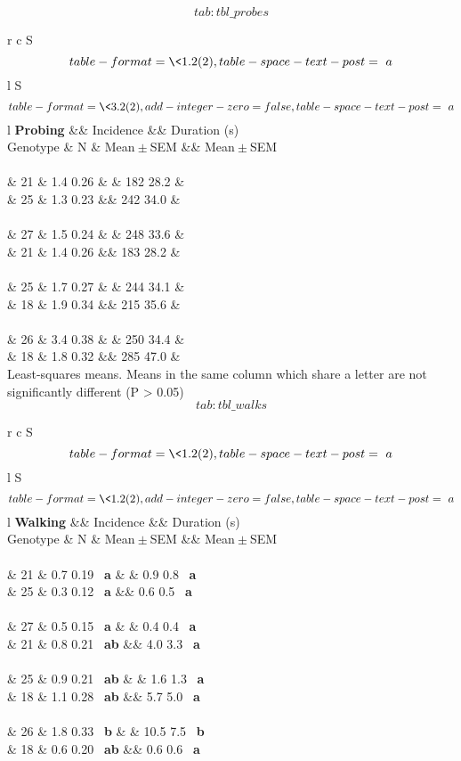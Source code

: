 \documentclass[]{article}
\begin{document}
\protect\hypertarget{tab:tbl_probes}{}{\[tab:tbl\_probes\]}

r c S\[table-format= \<1.2(2),table-space-text-post= a\] l
S\[table-format= \<3.2(2), add-integer-zero=false,
table-space-text-post= a\] l \textbf{Probing} \&\& Incidence \&\&
Duration (s)\\
Genotype \& N \& Mean\({}\pm{}\)SEM \&\& Mean\({}\pm{}\)SEM\\
~\\
\& 21 \& 1.4 0.26 \& \& 182 28.2 \&\\
\& 25 \& 1.3 0.23 \&\& 242 34.0 \&\\
~\\
\& 27 \& 1.5 0.24 \& \& 248 33.6 \&\\
\& 21 \& 1.4 0.26 \&\& 183 28.2 \&\\
~\\
\& 25 \& 1.7 0.27 \& \& 244 34.1 \&\\
\& 18 \& 1.9 0.34 \&\& 215 35.6 \&\\
~\\
\& 26 \& 3.4 0.38 \& \& 250 34.4 \&\\
\& 18 \& 1.8 0.32 \&\& 285 47.0 \&\\

Least-squares means. Means in the same column which share a letter are
not significantly different (P \textgreater{} 0.05)\\

\protect\hypertarget{tab:tbl_walks}{}{\[tab:tbl\_walks\]}

r c S\[table-format= \<1.2(2),table-space-text-post= a\] l
S\[table-format= \<1.2(2), add-integer-zero=false,
table-space-text-post= a\] l \textbf{Walking} \&\& Incidence \&\&
Duration (s)\\
Genotype \& N \& Mean\({}\pm{}\)SEM \&\& Mean\({}\pm{}\)SEM\\
~\\
\& 21 \& 0.7 0.19 ~\textbf{a} \& \& 0.9 0.8 ~\textbf{a}\\
\& 25 \& 0.3 0.12 ~\textbf{a} \&\& 0.6 0.5 ~\textbf{a}\\
~\\
\& 27 \& 0.5 0.15 ~\textbf{a} \& \& 0.4 0.4 ~\textbf{a}\\
\& 21 \& 0.8 0.21 ~\textbf{ab} \&\& 4.0 3.3 ~\textbf{a}\\
~\\
\& 25 \& 0.9 0.21 ~\textbf{ab} \& \& 1.6 1.3 ~\textbf{a}\\
\& 18 \& 1.1 0.28 ~\textbf{ab} \&\& 5.7 5.0 ~\textbf{a}\\
~\\
\& 26 \& 1.8 0.33 ~\textbf{b} \& \& 10.5 7.5 ~\textbf{b}\\
\& 18 \& 0.6 0.20 ~\textbf{ab} \&\& 0.6 0.6 ~\textbf{a}\\
\end{document}
